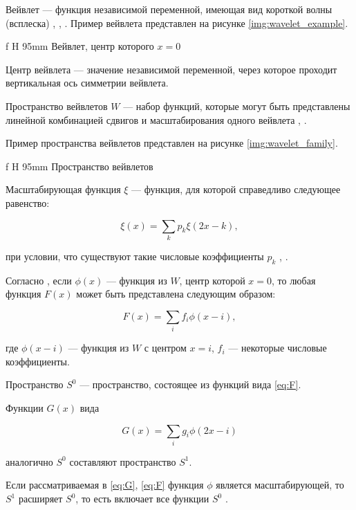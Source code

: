Вейвлет --- функция независимой переменной, имеющая вид короткой волны (всплеска) \cite{Kryzhevich}, \cite{Smolentsev}, \cite{Malla}. Пример вейвлета представлен на рисунке \ref{img:wavelet_example}.

 {f} {H} {95mm}%
{Вейвлет, центр которого $x=0$}

Центр вейвлета --- значение независимой переменной, через которое проходит вертикальная ось симметрии вейвлета.

Пространство вейвлетов $W$ --- набор функций, которые могут быть представлены линейной комбинацией сдвигов и масштабирования одного вейвлета \cite{Novikov}, \cite{Meyer}.

Пример пространства вейвлетов представлен на рисунке \ref{img:wavelet_family}.

 {f} {H} {95mm}%
{Пространство вейвлетов}

Масштабирующая функция $\xi$ --- функция, для которой справедливо следующее равенство:

\begin{equation}\label{eq:refine}
	\xi(x)=\sum_{k}p_k\xi(2x-k),
\end{equation}

при условии, что существуют такие числовые коэффициенты $p_k$ \cite{pixar}, \cite{Novikov}.

Согласно \cite{pixar}, если $\phi(x)$ --- функция из $W$, центр которой $x=0$, то любая функция $F(x)$ может быть представлена следующим образом:

\begin{equation}\label{eq:F}
	F(x)=\sum_{i}f_i\phi(x-i),
\end{equation}

где $\phi(x-i)$ --- функция из $W$ с центром $x=i$, $f_i$ --- некоторые числовые коэффициенты.

Пространство $S^0$ --- пространство, состоящее из функций вида \ref{eq:F}.

Функции $G(x)$ вида

\begin{equation}\label{eq:G}
	G(x)=\sum_{i}g_i\phi(2x-i)
\end{equation}

аналогично $S^0$ составляют пространство $S^1$. \cite{pixar}

Если рассматриваемая в \ref{eq:G}, \ref{eq:F} функция $\phi$ является масштабирующей, то $S^1$ расширяет $S^0$, то есть включает все функции $S^0$ \cite{pixar,Novikov}.


